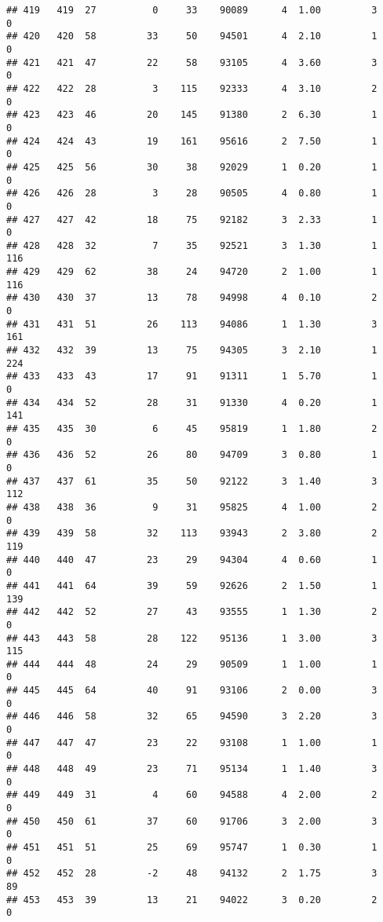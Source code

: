 \documentclass[
]{article}
\begin{document}
\begin{verbatim}
## 419   419  27          0     33    90089      4  1.00         3        0
## 420   420  58         33     50    94501      4  2.10         1        0
## 421   421  47         22     58    93105      4  3.60         3        0
## 422   422  28          3    115    92333      4  3.10         2        0
## 423   423  46         20    145    91380      2  6.30         1        0
## 424   424  43         19    161    95616      2  7.50         1        0
## 425   425  56         30     38    92029      1  0.20         1        0
## 426   426  28          3     28    90505      4  0.80         1        0
## 427   427  42         18     75    92182      3  2.33         1        0
## 428   428  32          7     35    92521      3  1.30         1      116
## 429   429  62         38     24    94720      2  1.00         1      116
## 430   430  37         13     78    94998      4  0.10         2        0
## 431   431  51         26    113    94086      1  1.30         3      161
## 432   432  39         13     75    94305      3  2.10         1      224
## 433   433  43         17     91    91311      1  5.70         1        0
## 434   434  52         28     31    91330      4  0.20         1      141
## 435   435  30          6     45    95819      1  1.80         2        0
## 436   436  52         26     80    94709      3  0.80         1        0
## 437   437  61         35     50    92122      3  1.40         3      112
## 438   438  36          9     31    95825      4  1.00         2        0
## 439   439  58         32    113    93943      2  3.80         2      119
## 440   440  47         23     29    94304      4  0.60         1        0
## 441   441  64         39     59    92626      2  1.50         1      139
## 442   442  52         27     43    93555      1  1.30         2        0
## 443   443  58         28    122    95136      1  3.00         3      115
## 444   444  48         24     29    90509      1  1.00         1        0
## 445   445  64         40     91    93106      2  0.00         3        0
## 446   446  58         32     65    94590      3  2.20         3        0
## 447   447  47         23     22    93108      1  1.00         1        0
## 448   448  49         23     71    95134      1  1.40         3        0
## 449   449  31          4     60    94588      4  2.00         2        0
## 450   450  61         37     60    91706      3  2.00         3        0
## 451   451  51         25     69    95747      1  0.30         1        0
## 452   452  28         -2     48    94132      2  1.75         3       89
## 453   453  39         13     21    94022      3  0.20         2        0

\end{verbatim}
\end{document}
